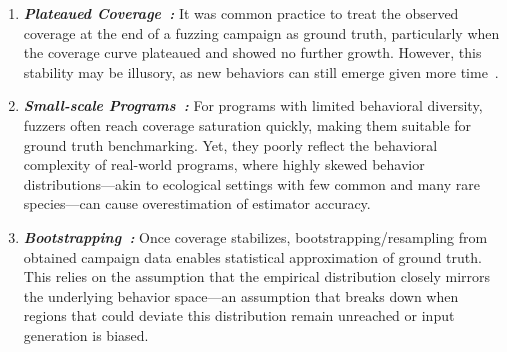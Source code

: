 \documentclass[conference]{IEEEtran}
\begin{document}
\begin{enumerate}
    \item \emph{\textbf{Plateaued Coverage~\cite{boehme2018stads}:}} It was common practice to treat the observed coverage at the end of a fuzzing campaign as ground truth, particularly when the coverage curve plateaued and showed no further growth. However, this stability may be illusory, as new behaviors can still emerge given more time~\cite{dijkstra2002ewd,boehme2021residual}.
    
    \item \emph{\textbf{Small-scale Programs~\cite{liyanage2023reachable}:}} For programs with limited behavioral diversity, fuzzers often reach coverage saturation quickly, making them suitable for ground truth benchmarking. Yet, they poorly reflect the behavioral complexity of real-world programs, where highly skewed behavior distributions—akin to ecological settings with few common and many rare species—can cause overestimation of estimator accuracy.
    
    \item \emph{\textbf{Bootstrapping~\cite{liyanage2023reachable}:}} Once coverage stabilizes, bootstrapping/resampling from obtained campaign data enables statistical approximation of ground truth. This relies on the assumption that the empirical distribution closely mirrors the underlying behavior space—an assumption that breaks down when regions that could deviate this distribution remain unreached or input generation is biased.
\end{enumerate}



\end{document}
